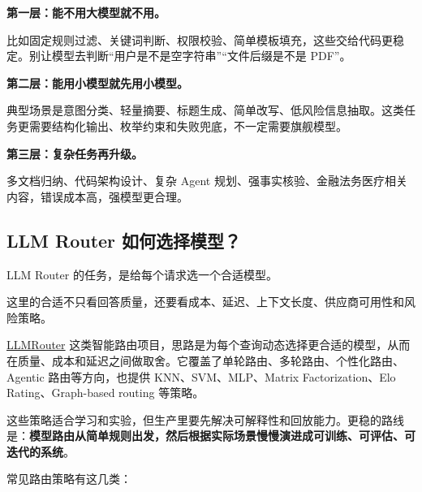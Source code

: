 \documentclass[9pt,a4paper,twocolumn]{ctexart}
\begin{document}
\textbf{第一层：能不用大模型就不用。}



比如固定规则过滤、关键词判断、权限校验、简单模板填充，这些交给代码更稳定。别让模型去判断“用户是不是空字符串”“文件后缀是不是 PDF”。



\textbf{第二层：能用小模型就先用小模型。}



典型场景是意图分类、轻量摘要、标题生成、简单改写、低风险信息抽取。这类任务更需要结构化输出、枚举约束和失败兜底，不一定需要旗舰模型。



\textbf{第三层：复杂任务再升级。}



多文档归纳、代码架构设计、复杂 Agent 规划、强事实核验、金融法务医疗相关内容，错误成本高，强模型更合理。



\subsection*{LLM Router 如何选择模型？}


LLM Router 的任务，是给每个请求选一个合适模型。



这里的合适不只看回答质量，还要看成本、延迟、上下文长度、供应商可用性和风险策略。



\href{https://github.com/ulab-uiuc/LLMRouter}{LLMRouter} 这类智能路由项目，思路是为每个查询动态选择更合适的模型，从而在质量、成本和延迟之间做取舍。它覆盖了单轮路由、多轮路由、个性化路由、Agentic 路由等方向，也提供 KNN、SVM、MLP、Matrix Factorization、Elo Rating、Graph-based routing 等策略。



这些策略适合学习和实验，但生产里要先解决可解释性和回放能力。更稳的路线是：\textbf{模型路由从简单规则出发，然后根据实际场景慢慢演进成可训练、可评估、可迭代的系统}。



常见路由策略有这几类：
\end{document}
